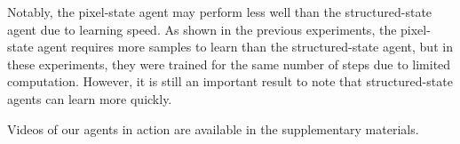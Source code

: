 \documentclass[10pt,twocolumn,letterpaper]{article}
\begin{document}
Notably, the pixel-state agent may perform less well than the structured-state
agent due to learning speed. As shown in the previous experiments, the
pixel-state agent requires more samples to learn than the structured-state
agent, but in these experiments, they were trained for the same number of
steps due to limited computation. However, it is still an important result to
note that structured-state agents can learn more quickly.

Videos of our agents in action are available in the supplementary materials.

{\small


}
\end{document}
